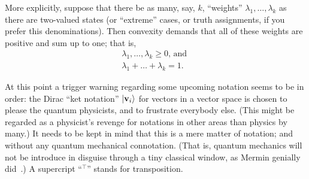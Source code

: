 \documentclass[%
  twocolumn,
 showpacs,
 showkeys,
 preprintnumbers,
 amsmath,amssymb,
 aps,
  pra,
  longbibliography,
 floatfix,
 ]{revtex4-1}
\begin{document}
More explicitly, suppose that there be as many, say, $k$, ``weights'' $\lambda_1, \ldots ,\lambda_k$ as there are two-valued states
(or ``extreme'' cases, or truth assignments, if you prefer this denominations).
Then convexity demands that all of these weights are positive and sum up to one; that is,
\begin{equation}
\begin{split}
\lambda_1, \ldots , \lambda_k  \ge 0
\text{, and }
\\
\lambda_1 + \ldots + \lambda_k   = 1
.
\label{2017-b-convexity}
\end{split}
\end{equation}


At this point a trigger warning regarding some upcoming notation seems to be in order:
the Dirac ``ket notation'' $\vert {\bf v}_i \rangle$ for  vectors in a vector space is chosen to please the
quantum physicists, and to frustrate everybody else.
(This might be regarded as a physicist's revenge for notations in other areas than physics by many.)
It needs to be kept in mind that this is a mere matter of notation; and without any quantum mechanical connotation.
(That is, quantum mechanics will not be introduce in disguise through a tiny classical window,
as Mermin genially did~\cite{mermin-07}.)
A supercript ``$^\intercal$'' stands for transposition.
\end{document}
